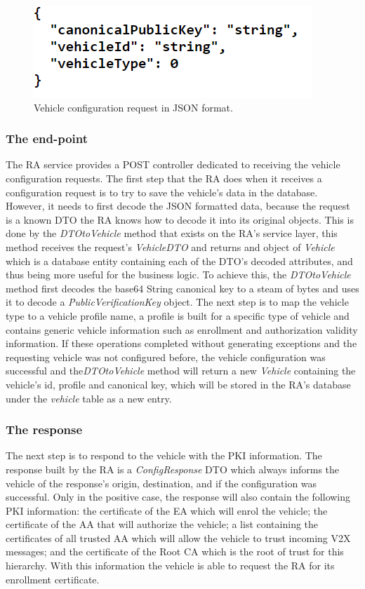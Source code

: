 \begin{figure}[!h]
	\centering
	\includegraphics[width=0.5
	\textwidth]{Figures/conf_req}
	\caption{\label{fig:conf_req}Vehicle configuration request in JSON format.}
\end{figure}

\subsubsection{The end-point}
The RA service provides a POST controller dedicated to receiving the vehicle configuration requests. The first step that the RA does when it receives a configuration request is to try to save the vehicle's data in the database. However, it needs to first decode the JSON formatted data, because the request is a known DTO the RA knows how to decode it into its original objects. This is done by the \textit{DTOtoVehicle} method that exists on the RA's service layer, this method receives the request's \textit{VehicleDTO} and returns and object of \textit{Vehicle} which is a database entity containing each of the DTO's decoded attributes, and thus being more useful for the business logic. To achieve this, the \textit{DTOtoVehicle} method first decodes the base64 String canonical key to a steam of bytes and uses it to decode a \textit{PublicVerificationKey} object. The next step is to map the vehicle type to a vehicle profile name, a profile is built for a specific type of vehicle and contains generic vehicle information such as enrollment and authorization validity information. If these operations completed without generating exceptions and the requesting vehicle was not configured before, the vehicle configuration was successful and the\textit{DTOtoVehicle} method will return a new \textit{Vehicle} containing the vehicle's id, profile and canonical key, which will be stored in the RA's database under the \textit{vehicle} table as a new entry. 

\subsubsection{The response}
The next step is to respond to the vehicle with the PKI information. The response built by the RA is a \textit{ConfigResponse} DTO which always informs the vehicle of the response's origin, destination, and if the configuration was successful. Only in the positive case, the response will also contain the following PKI information: the certificate of the EA which will enrol the vehicle; the certificate of the AA that will authorize the vehicle; a list containing the certificates of all trusted AA which will allow the vehicle to trust incoming V2X messages; and the certificate of the Root CA which is the root of trust for this hierarchy. With this information the vehicle is able to request the RA for its enrollment certificate. 


